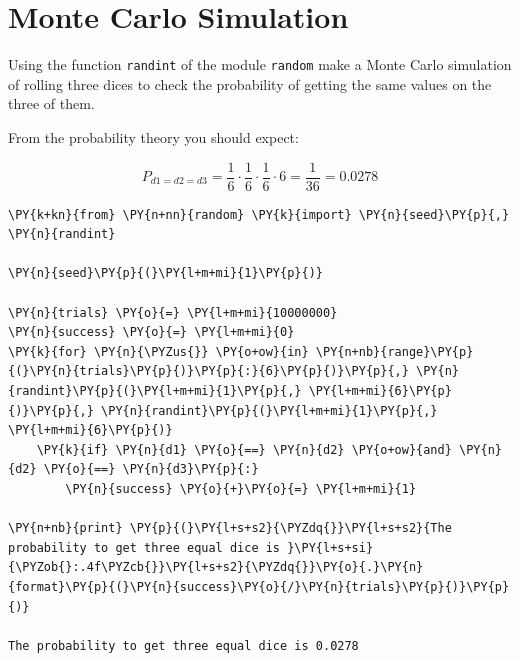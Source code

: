 \chapter{Monte Carlo Simulation}\label{introduction-to-python---lesson-8}

\begin{Exercise}[title={(Dice Simulation)}]
Using the function \texttt{randint} of the module \texttt{random} make a
Monte Carlo simulation of rolling three dices to check the probability
of getting the same values on the three of them.

From the probability theory you should expect:

\[P_{d1=d2=d3} = \frac{1}{6}\cdot\frac{1}{6}\cdot\frac{1}{6}\cdot 6 = \frac{1}{36} = 0.0278\]
\end{Exercise}
\begin{Answer}
\begin{tcolorbox}[size=fbox, boxrule=1pt, colback=cellbackground, colframe=cellborder]
\begin{Verbatim}[commandchars=\\\{\}]
\PY{k+kn}{from} \PY{n+nn}{random} \PY{k}{import} \PY{n}{seed}\PY{p}{,} \PY{n}{randint}
        
\PY{n}{seed}\PY{p}{(}\PY{l+m+mi}{1}\PY{p}{)}
        
\PY{n}{trials} \PY{o}{=} \PY{l+m+mi}{10000000}
\PY{n}{success} \PY{o}{=} \PY{l+m+mi}{0}
\PY{k}{for} \PY{n}{\PYZus{}} \PY{o+ow}{in} \PY{n+nb}{range}\PY{p}{(}\PY{n}{trials}\PY{p}{)}\PY{p}{:}{6}\PY{p}{)}\PY{p}{,} \PY{n}{randint}\PY{p}{(}\PY{l+m+mi}{1}\PY{p}{,} \PY{l+m+mi}{6}\PY{p}{)}\PY{p}{,} \PY{n}{randint}\PY{p}{(}\PY{l+m+mi}{1}\PY{p}{,} \PY{l+m+mi}{6}\PY{p}{)}    
    \PY{k}{if} \PY{n}{d1} \PY{o}{==} \PY{n}{d2} \PY{o+ow}{and} \PY{n}{d2} \PY{o}{==} \PY{n}{d3}\PY{p}{:}
        \PY{n}{success} \PY{o}{+}\PY{o}{=} \PY{l+m+mi}{1}
    
\PY{n+nb}{print} \PY{p}{(}\PY{l+s+s2}{\PYZdq{}}\PY{l+s+s2}{The probability to get three equal dice is }\PY{l+s+si}{\PYZob{}:.4f\PYZcb{}}\PY{l+s+s2}{\PYZdq{}}\PY{o}{.}\PY{n}{format}\PY{p}{(}\PY{n}{success}\PY{o}{/}\PY{n}{trials}\PY{p}{)}\PY{p}{)}
        
The probability to get three equal dice is 0.0278
\end{Verbatim}
\end{tcolorbox}
\end{Answer}

